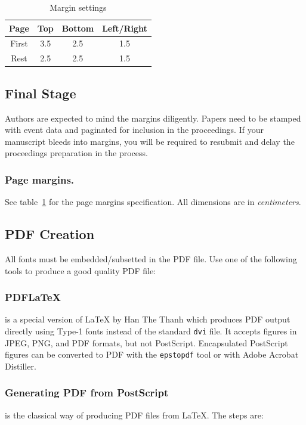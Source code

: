 \documentclass{ifacconf}
\begin{document}
\begin{table}[hb]
\begin{center}
\caption{Margin settings}\label{tb:margins}
\begin{tabular}{cccc}
Page & Top & Bottom & Left/Right \\\hline
First & 3.5 & 2.5 & 1.5 \\
Rest & 2.5 & 2.5 & 1.5 \\ \hline
\end{tabular}
\end{center}
\end{table}

\subsection{Final Stage}

Authors are expected to mind the margins diligently.  Papers need to
be stamped with event data and paginated for inclusion in the
proceedings. If your manuscript bleeds into margins, you will be
required to resubmit and delay the proceedings preparation in the
process.

\subsubsection{Page margins.} See table~\ref{tb:margins} for the
page margins specification. All dimensions are in \emph{centimeters}.


\subsection{PDF Creation}

All fonts must be embedded/subsetted in the PDF file. Use one of the
following tools to produce a good quality PDF file:

\subsubsection{PDFLaTeX} is a special version of LaTeX by Han The
Thanh which produces PDF output directly using Type-1 fonts instead of
the standard \texttt{dvi} file. It accepts figures in JPEG, PNG, and PDF
formats, but not PostScript. Encapsulated PostScript figures can be
converted to PDF with the \texttt{epstopdf} tool or with Adobe Acrobat
Distiller.

\subsubsection{Generating PDF from PostScript} is the classical way of
producing PDF files from LaTeX. The steps are:
\end{document}
